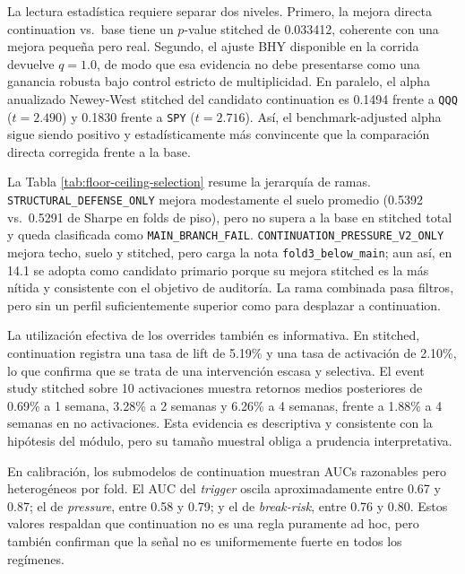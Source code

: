 \documentclass[11pt]{article}
\begin{document}


La lectura estad\'istica requiere separar dos niveles. Primero, la mejora directa continuation vs.\ base tiene un $p$-value stitched de 0.033412, coherente con una mejora peque\~na pero real. Segundo, el ajuste BHY disponible en la corrida devuelve $q=1.0$, de modo que esa evidencia no debe presentarse como una ganancia robusta bajo control estricto de multiplicidad. En paralelo, el alpha anualizado Newey-West stitched del candidato continuation es 0.1494 frente a \texttt{QQQ} ($t=2.490$) y 0.1830 frente a \texttt{SPY} ($t=2.716$). As\'i, el benchmark-adjusted alpha sigue siendo positivo y estad\'isticamente m\'as convincente que la comparaci\'on directa corregida frente a la base.

La Tabla \ref{tab:floor-ceiling-selection} resume la jerarqu\'ia de ramas. \texttt{STRUCTURAL\_DEFENSE\_ONLY} mejora modestamente el suelo promedio (0.5392 vs.\ 0.5291 de Sharpe en folds de piso), pero no supera a la base en stitched total y queda clasificada como \texttt{MAIN\_BRANCH\_FAIL}. \texttt{CONTINUATION\_PRESSURE\_V2\_ONLY} mejora techo, suelo y stitched, pero carga la nota \texttt{fold3\_below\_main}; aun as\'i, en 14.1 se adopta como candidato primario porque su mejora stitched es la m\'as n\'itida y consistente con el objetivo de auditor\'ia. La rama combinada pasa filtros, pero sin un perfil suficientemente superior como para desplazar a continuation.



La utilizaci\'on efectiva de los overrides tambi\'en es informativa. En stitched, continuation registra una tasa de lift de 5.19\% y una tasa de activaci\'on de 2.10\%, lo que confirma que se trata de una intervenci\'on escasa y selectiva. El event study stitched sobre 10 activaciones muestra retornos medios posteriores de 0.69\% a 1 semana, 3.28\% a 2 semanas y 6.26\% a 4 semanas, frente a 1.88\% a 4 semanas en no activaciones. Esta evidencia es descriptiva y consistente con la hip\'otesis del m\'odulo, pero su tama\~no muestral obliga a prudencia interpretativa.



En calibraci\'on, los submodelos de continuation muestran AUCs razonables pero heterog\'eneos por fold. El AUC del \textit{trigger} oscila aproximadamente entre 0.67 y 0.87; el de \textit{pressure}, entre 0.58 y 0.79; y el de \textit{break-risk}, entre 0.76 y 0.80. Estos valores respaldan que continuation no es una regla puramente ad hoc, pero tambi\'en confirman que la se\~nal no es uniformemente fuerte en todos los reg\'imenes.
\end{document}
